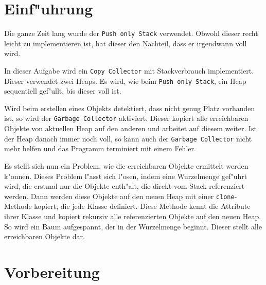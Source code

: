 \section{Einf"uhrung}
Die ganze Zeit lang wurde der \verb|Push only Stack| verwendet.  Obwohl dieser
recht leicht zu implementieren ist, hat dieser den Nachteil, dass er irgendwann
voll wird.

In dieser Aufgabe wird ein \verb|Copy Collector| mit Stackverbrauch
implementiert. Dieser verwendet zwei Heaps. Es wird, wie beim \verb|Push only Stack|,
ein Heap sequentiell gef"ullt, bis dieser voll ist.

Wird beim erstellen eines Objekts detektiert, dass nicht genug Platz vorhanden
ist, so wird der \verb|Garbage Collector| aktiviert.
Dieser kopiert alle erreichbaren Objekte von aktuellen Heap auf den anderen und
arbeitet auf diesem weiter. Ist der Heap danach immer noch voll, so kann auch
der \verb|Garbage Collector| nicht mehr helfen und das Programm terminiert mit
einem Fehler.

Es stellt sich nun ein Problem, wie die erreichbaren Objekte ermittelt werden
k"onnen.  Dieses Problem l"asst sich l"osen, indem eine Wurzelmenge gef"uhrt
wird, die erstmal nur die Objekte enth"alt, die direkt vom Stack referenziert
werden. Dann werden diese Objekte auf den neuen Heap mit einer
\verb|clone|-Methode kopiert, die jede Klasse definiert.  Diese Methode kennt
die Attribute ihrer Klasse und kopiert rekursiv alle referenzierten Objekte auf
den neuen Heap. So wird ein Baum aufgespannt, der in der Wurzelmenge beginnt.
Dieser stellt alle erreichbaren Objekte dar.


\section{Vorbereitung}

